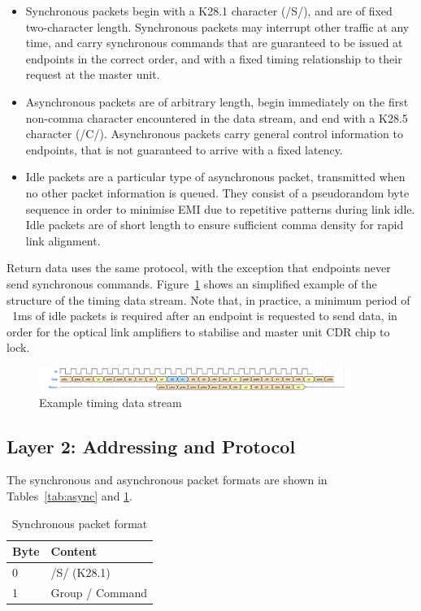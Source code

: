 \documentclass[a4paper,11pt]{article}
\begin{document}
\begin{itemize}
	\item Synchronous packets begin with a K28.1 character (/S/), and are of fixed two-character length. Synchronous packets may interrupt other traffic at any time, and carry synchronous commands that are guaranteed to be issued at endpoints in the correct order, and with a fixed timing relationship to their request at the master unit.
	\item Asynchronous packets are of arbitrary length, begin immediately on the first non-comma character encountered in the data stream, and end with a K28.5 character (/C/). Asynchronous packets carry general control information to endpoints, that is not guaranteed to arrive with a fixed latency.
	\item Idle packets are a particular type of asynchronous packet, transmitted when no other packet information is queued. They consist of a pseudorandom byte sequence in order to minimise EMI due to repetitive patterns during link idle. Idle packets are of short length to ensure sufficient comma density for rapid link alignment.
\end{itemize}

Return data uses the same protocol, with the exception that endpoints never send synchronous commands. Figure~\ref{fig:wave} shows an simplified example of the structure of the timing data stream. Note that, in practice, a minimum period of ~1ms of idle packets is required after an endpoint is requested to send data, in order for the optical link amplifiers to stabilise and master unit CDR chip to lock.

\begin{figure}[p]
	\centering
	\includegraphics[width=0.9\textwidth]{timing_protocol_wavedrom_01.pdf}
	\caption{Example timing data stream}
	\label{fig:wave}
\end{figure}

\subsection{Layer 2: Addressing and Protocol}

The synchronous and asynchronous packet formats are shown in Tables~\ref{tab:async} and \ref{tab:sync}.

\begin{table}[h!]
  \centering
  \begin{tabular}{@{}ll@{}} \toprule
    Byte & Content \\ \midrule
    0 & /S/ (K28.1) \\
    1 & Group / Command \\ \bottomrule
  \end{tabular}
  \caption{Synchronous packet format}
  \label{tab:sync}
\end{table}
\end{document}
